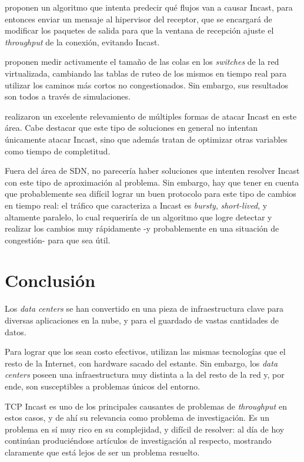 \documentclass[runningheads,a4paper]{llncs}
\begin{document}
\citet{Abdelmoniem_SICC_2018} proponen un algoritmo que intenta predecir qué flujos van a causar Incast, para entonces enviar un mensaje al hipervisor del receptor, que se encargará de modificar los paquetes de salida para que la ventana de recepción ajuste el \textit{throughput} de la conexión, evitando Incast.

\citet{Gholami_ReRoute_SDN_2015} proponen medir activamente el tamaño de las colas en los \textit{switches} de la red virtualizada, cambiando las tablas de ruteo de los mismos en tiempo real para utilizar los caminos más cortos no congestionados. Sin embargo, sus resultados son todos a través de simulaciones.

\citet{Hafeez_SDN_2018} realizaron un excelente relevamiento de múltiples formas de atacar Incast en este área. Cabe destacar que este tipo de soluciones en general no intentan únicamente atacar Incast, sino que además tratan de optimizar otras variables como tiempo de completitud.

Fuera del área de SDN, no parecería haber soluciones que intenten resolver Incast con este tipo de aproximación al problema. Sin embargo, hay que tener en cuenta que probablemente sea difícil lograr un buen protocolo para este tipo de cambios en tiempo real: el tráfico que caracteriza a Incast es \textit{bursty}, \textit{short-lived}, y altamente paralelo, lo cual requeriría de un algoritmo que logre detectar y realizar los cambios muy rápidamente -y probablemente en una situación de congestión- para que sea útil.

\section{Conclusión} \label{conclusion}

Los \textit{data centers} se han convertido en una pieza de infraestructura clave para diversas aplicaciones en la nube, y para el guardado de vastas cantidades de datos.

Para lograr que los sean costo efectivos, utilizan las mismas tecnologías que el resto de la Internet, con hardware sacado del estante. Sin embargo, los \textit{data centers} poseen una infraestructura muy distinta a la del resto de la red y, por ende, son susceptibles a problemas únicos del entorno.

TCP Incast es uno de los principales causantes de problemas de \textit{throughput} en estos casos, y de ahí su relevancia como problema de investigación. Es un problema en sí muy rico en su complejidad, y difícil de resolver: al día de hoy continúan produciéndose artículos de investigación al respecto, mostrando claramente que está lejos de ser un problema resuelto.
\end{document}
